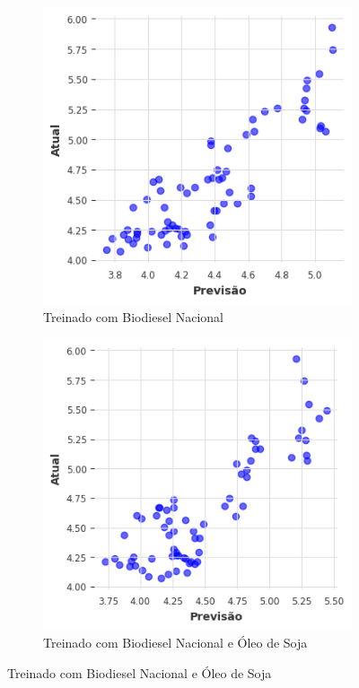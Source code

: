 \begin{figure}[htbp]
	\centering
	\begin{subfigure}[b]{0.40\textwidth}
		\centering
		\includegraphics[width=\textwidth]{figuras/imp_brasil_scatter.png} %
		\caption{Treinado com Biodiesel Nacional \newline}
		\label{fig:imp_brasil_scatter}
	\end{subfigure}
	\hfill
	\begin{subfigure}[b]{0.40\textwidth}
		\centering
		\includegraphics[width=\textwidth]{figuras/imp_brasil_oil_scatter.png} %
		\caption{Treinado com Biodiesel Nacional e Óleo de Soja}
		\label{fig:imp_brasil_oil_scatter}
	\end{subfigure}


\end{figure}
